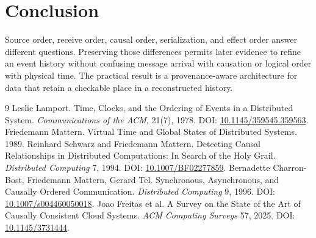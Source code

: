 \documentclass[11pt]{article}
\begin{document}
\section{Conclusion}
Source order, receive order, causal order, serialization, and effect order answer different questions. Preserving those differences permits later evidence to refine an event history without confusing message arrival with causation or logical order with physical time. The practical result is a provenance-aware architecture for data that retain a checkable place in a reconstructed history.

\begin{thebibliography}{9}
 Leslie Lamport. Time, Clocks, and the Ordering of Events in a Distributed System. \emph{Communications of the ACM}, 21(7), 1978. DOI: \href{https://doi.org/10.1145/359545.359563}{10.1145/359545.359563}.
 Friedemann Mattern. Virtual Time and Global States of Distributed Systems. 1989.
 Reinhard Schwarz and Friedemann Mattern. Detecting Causal Relationships in Distributed Computations: In Search of the Holy Grail. \emph{Distributed Computing} 7, 1994. DOI: \href{https://doi.org/10.1007/BF02277859}{10.1007/BF02277859}.
 Bernadette Charron-Bost, Friedemann Mattern, Gerard Tel. Synchronous, Asynchronous, and Causally Ordered Communication. \emph{Distributed Computing} 9, 1996. DOI: \href{https://doi.org/10.1007/s004460050018}{10.1007/s004460050018}.
 Joao Freitas et al. A Survey on the State of the Art of Causally Consistent Cloud Systems. \emph{ACM Computing Surveys} 57, 2025. DOI: \href{https://doi.org/10.1145/3731444}{10.1145/3731444}.
\end{thebibliography}
\end{document}
